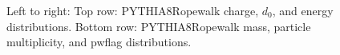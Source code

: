 \begin{figure}[H]
\hfill
{}\hfill
\caption{Left to right: Top row: PYTHIA8Ropewalk charge, $d_0$, and energy distributions. Bottom row: PYTHIA8Ropewalk mass, particle multiplicity, and pwflag distributions.}
\end{figure}

